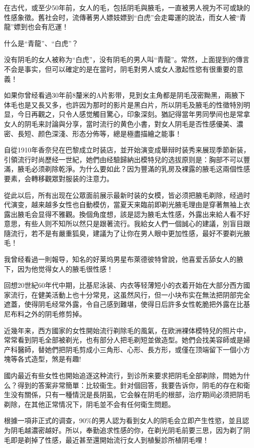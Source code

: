 \documentclass[12pt,UTF8]{ctexbook}
\begin{document}
在古代，或至少50年前，女人的毛，包括阴毛與腋毛，一直被男人視为不可或缺的性感象徵。舊社会时，流傳著男人嫖妓嫖到“白虎”会走霉運的說法，而女人被“青龍”嫖到也会有厄運！

什么是“青龍”、“白虎”？

没有阴毛的女人被称为“白虎”，没有阴毛的男人叫“青龍”。常然，上面提到的傳言不会是事实，但可以確定的是在當时，阴毛對男人或女人激起性慾有很重要的意義！

如果你曾经看過30年前8釐米的A片影带，見到女主角都是阴毛茂密黝黑，兩腋下体毛也是又長又多，也許因为那时的影片是黑白片，所以阴毛及腋毛的性徵特別明显，今日再觀之，只令人感觉觸目驚心，印象深刻。猶記得當年男同學间也是常拿女人的阴毛来討論與分享，當时流行的黄色小書，對女人阴毛是否性感優美、濃密、長短、颜色深淺、形态分佈等，總是極盡描繪之能事！

自從1910年香奈兒在巴黎成立时装店，並开始演变成舉辩时装秀来展现季節新装，引領流行时尚歷经一世紀，她們由经驗歸納出模特兒的选拔原则是：胸部不可以豐滿，腋毛必须剃除乾淨。为什么要如此？因为豐滿的乳房及裸露的腋毛这兩個性感要素，会轉移觀眾對服装的注意力。

從此以后，所有出现在公眾面前展示最新时装的女模，皆必须把腋毛剃除，经過时代演变，越来越多女性也自動模仿，當夏天来臨前即剃光腋毛理由是穿著無袖上衣露出腋毛会显得不雅觀。換個角度想，該是認为腋毛太性感，外露出来給人看不好意思，有些人则不知所以然只是跟著流行。我給女人們一個誠心的建議，別盲目跟隨流行，若不是有嚴重狐臭，建議为了让你在男人眼中更加性感，最好不要剃光腋毛！

我曾经看過一則報导，知名的好莱坞男星布萊德彼特曾說，他喜爱舌舔女人的腋下，因为他觉得女人的腋毛很性感！

回想20世紀60年代中期，比基尼泳装、内衣等轻薄短小的衣着开始在大部分西方國家流行，在健美活動上也十分常見，这虽然风行，但一小块布实在無法把阴部完全遮蓋，使得阴毛经常外露，令自己感到難堪，使得日后許多女性乾脆把外露在比基尼布料之外的阴毛修剪掉。

近幾年来，西方國家的女性開始流行剃除毛的風氣，在欧洲裸体模特兒的照片中，常常看到阴毛全部被剃光，也有部分人把毛剃短並做造型。她們会找美容師或是婦产科醫師，替她們把阴毛剪成小三角形、心形、長方形，或僅在顶端留下一個小方塊等各式造型，煞是有趣!

國内最近有些女性也開始追逐这种流行，到诊所来要求把阴毛全部剃除，問她为什么？得到的答案非常簡單：比较衞生。針对個回答，我要告诉你，阴毛的存在和衛生没有關係，只有一種情況是長阴虱，它会躲在阴毛的根部，治疗期间必须把阴毛剃除，在其他正常情况下，阴毛並不会有任何衛生問题。

根據一項非正式的调查，90\%的男人認为看到女人的阴毛会立即产生性慾，並且認为阴毛越濃密越好。所以，奉勤追求性感的你，在剃光阴毛前要三思，因为剃了阴毛即是剃掉了性感，最近甚至還開始流行女人到植髮診所植阴毛哩！
\end{document}
